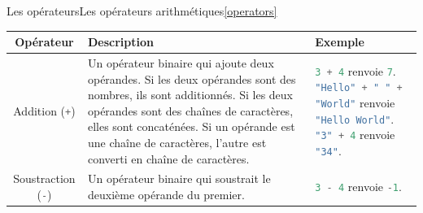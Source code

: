 \documentclass{beamer}
\begin{document}
    \begin{frame}{Les opérateurs}{Les opérateurs arithmétiques\cref{operators}}
        \begin{tiny}
            \begin{table}[h!]
                \centering
                \begin{tabular}{|c|p{4cm}|p{4cm}|}
                    \hline
                    \textbf{Opérateur}                                  & \textbf{Description}                                                                                                                                                                                                                                                                   & \textbf{Exemple}                                                                                                                                                                                                                                                                                              \\
                    \hline
                    Addition (\lstinline[language=Javascript]!+!)       & Un opérateur binaire qui ajoute deux opérandes. Si les deux opérandes sont des nombres, ils sont additionnés. Si les deux opérandes sont des chaînes de caractères, elles sont concaténées. Si un opérande est une chaîne de caractères, l'autre est converti en chaîne de caractères. & \lstinline[language=Javascript]!3 + 4! renvoie \lstinline[language=Javascript]!7!. \newline \lstinline[language=Javascript]!"Hello" + " " + "World"! renvoie \lstinline[language=Javascript]!"Hello World"!. \newline \lstinline[language=Javascript]!"3" + 4! renvoie \lstinline[language=Javascript]!"34"!. \\
                    \hline
                    Soustraction (\lstinline[language=Javascript]!-!)   & Un opérateur binaire qui soustrait le deuxième opérande du premier.                                                                                                                                                                                                                    & \lstinline[language=Javascript]!3 - 4! renvoie \lstinline[language=Javascript]!-1!.                                                                                                                                                                                                                           \\

\end{tabular}
\end{table}
\end{tiny}
\end{frame}
\end{document}
